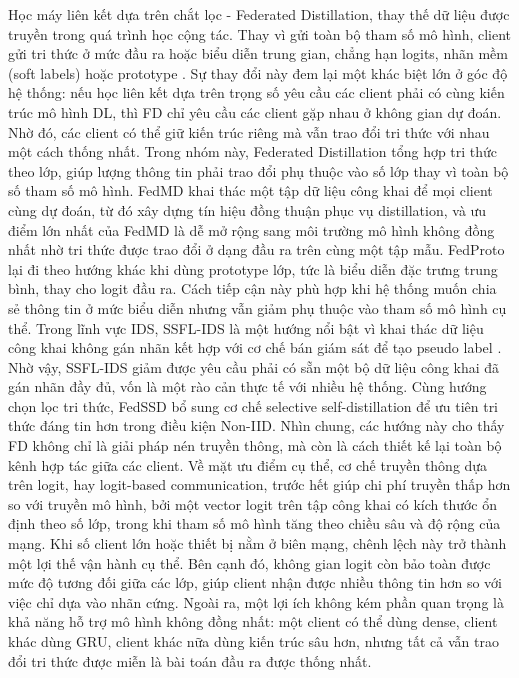 Học máy liên kết dựa trên chắt lọc - Federated Distillation, thay thế dữ liệu được truyền trong quá trình học cộng tác. Thay vì gửi toàn bộ tham số mô hình, client gửi tri thức ở mức đầu ra hoặc biểu diễn trung gian, chẳng hạn logits, nhãn mềm (soft labels) hoặc prototype \cite{hinton2015kd,jeong2018federateddistillation,li2019fedmd,tan2022fedproto,li2024fdsurvey}. Sự thay đổi này đem lại một khác biệt lớn ở góc độ hệ thống: nếu học liên kết dựa trên trọng số yêu cầu các client phải có cùng kiến trúc mô hình DL, thì FD chỉ yêu cầu các client gặp nhau ở không gian dự đoán. Nhờ đó, các client có thể giữ kiến trúc riêng mà vẫn trao đổi tri thức với nhau một cách thống nhất.
\bigbreak\noindent
Trong nhóm này, Federated Distillation \cite{jeong2018federateddistillation} tổng hợp tri thức theo lớp, giúp lượng thông tin phải trao đổi phụ thuộc vào số lớp thay vì toàn bộ số tham số mô hình. FedMD \cite{li2019fedmd} khai thác một tập dữ liệu công khai để mọi client cùng dự đoán, từ đó xây dựng tín hiệu đồng thuận phục vụ distillation, và ưu điểm lớn nhất của FedMD là dễ mở rộng sang môi trường mô hình không đồng nhất nhờ tri thức được trao đổi ở dạng đầu ra trên cùng một tập mẫu. FedProto \cite{tan2022fedproto} lại đi theo hướng khác khi dùng prototype lớp, tức là biểu diễn đặc trưng trung bình, thay cho logit đầu ra. Cách tiếp cận này phù hợp khi hệ thống muốn chia sẻ thông tin ở mức biểu diễn nhưng vẫn giảm phụ thuộc vào tham số mô hình cụ thể.
\bigbreak\noindent
Trong lĩnh vực IDS, SSFL-IDS là một hướng nổi bật vì khai thác dữ liệu công khai không gán nhãn kết hợp với cơ chế bán giám sát để tạo pseudo label \cite{zhao2022ssfl}. Nhờ vậy, SSFL-IDS giảm được yêu cầu phải có sẵn một bộ dữ liệu công khai đã gán nhãn đầy đủ, vốn là một rào cản thực tế với nhiều hệ thống. Cùng hướng chọn lọc tri thức, FedSSD \cite{he2022fedssd} bổ sung cơ chế selective self-distillation để ưu tiên tri thức đáng tin hơn trong điều kiện Non-IID. Nhìn chung, các hướng này cho thấy FD không chỉ là giải pháp nén truyền thông, mà còn là cách thiết kế lại toàn bộ kênh hợp tác giữa các client.
\bigbreak\noindent
Về mặt ưu điểm cụ thể, cơ chế truyền thông dựa trên logit, hay logit-based communication, trước hết giúp chi phí truyền thấp hơn so với truyền mô hình, bởi một vector logit trên tập công khai có kích thước ổn định theo số lớp, trong khi tham số mô hình tăng theo chiều sâu và độ rộng của mạng. Khi số client lớn hoặc thiết bị nằm ở biên mạng, chênh lệch này trở thành một lợi thế vận hành cụ thể. Bên cạnh đó, không gian logit còn bảo toàn được mức độ tương đối giữa các lớp, giúp client nhận được nhiều thông tin hơn so với việc chỉ dựa vào nhãn cứng. Ngoài ra, một lợi ích không kém phần quan trọng là khả năng hỗ trợ mô hình không đồng nhất: một client có thể dùng dense, client khác dùng GRU, client khác nữa dùng kiến trúc sâu hơn, nhưng tất cả vẫn trao đổi tri thức được miễn là bài toán đầu ra được thống nhất.
